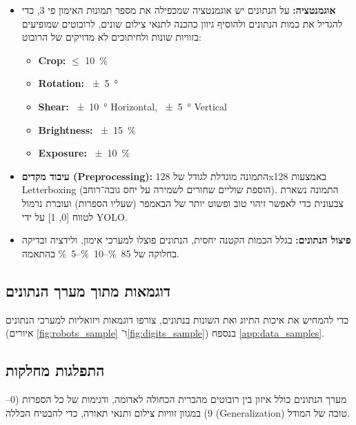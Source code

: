 \begin{itemize}

\item \textbf{אוגמנטציה:} על הנתונים יש אוגמנטציה שמכפילה את מספר תמונות האימון
  פי 3, כדי להגדיל את כמות הנתונים ולהוסיף גיוון כהכנה לתנאי צילום
  שונים, לרובוטים שמופיעים בזוויות שונות ולחיתוכים לא מדויקים של הרובוט:
  \begin{english}
    \begin{itemize}
    \item \textbf{Crop:} $\leq$ \qty{10}{\percent}
    \item \textbf{Rotation:} \qty{+-5}{\degree}
    \item \textbf{Shear:} \qty{+-10}{\degree} Horizontal,
      \qty{+-5}{\degree} Vertical
    \item \textbf{Brightness:} \qty{+-15}{\percent}
    \item \textbf{Exposure:} \qty{+-10}{\percent}
    \end{itemize}
  \end{english}

\item \textbf{עיבוד מקדים (\textenglish{Preprocessing}):} התמונה
  מוגדלת לגודל של \textenglish{128x128} באמצעות
  \textenglish{Letterboxing} (הוספת שוליים שחורים לשמירה על יחס
  גובה־רוחב). התמונה נשארת צבעונית כדי לאפשר זיהוי טוב ופשוט יותר של הבאמפר
  (שעליו הספרות) ועוברת נרמול לטווח [0, 1] על ידי \textenglish{YOLO}.

\item \textbf{פיצול הנתונים:} בגלל הכמות הקטנה יחסית, הנתונים פוצלו
  למערכי אימון, ולידציה ובדיקה בחלוקה של
  \textenglish{\qty{85}{\percent}--\qty{10}{\percent}--\qty{5}{\percent}}
  בהתאמה.
\end{itemize}

\subsection{דוגמאות מתוך מערך הנתונים}

כדי להמחיש את איכות התיוג ואת השונות בנתונים, צורפו דוגמאות ויזואליות
למערכי הנתונים (איורים \ref{fig:robots_sample} ו־\ref{fig:digits_sample}) בנספח
\ref{app:data_samples}.

\subsection{התפלגות מחלקות}

מערך הנתונים כולל איזון בין רובוטים מהברית הכחולה לאדומה, ודגימות של
כל הספרות (0--9) במגוון זוויות צילום ותנאי תאורה, כדי להבטיח הכללה
(\textenglish{Generalization}) טובה של המודל.


